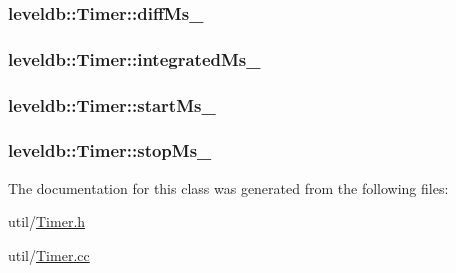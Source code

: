 \subsubsection[{diff\+Ms\+\_\+}]{ leveldb\+::\+Timer\+::diff\+Ms\+\_\+\hspace{0.3cm}{\ttfamily [private]}}\label{classleveldb_1_1_timer_a4a39508e01c4b2ac80cdd47ad0346dfb}
\hypertarget{classleveldb_1_1_timer_a5d9e98f8daf0c1868ab87a217f3c55b4}{}
\subsubsection[{integrated\+Ms\+\_\+}]{ leveldb\+::\+Timer\+::integrated\+Ms\+\_\+\hspace{0.3cm}{\ttfamily [private]}}\label{classleveldb_1_1_timer_a5d9e98f8daf0c1868ab87a217f3c55b4}
\hypertarget{classleveldb_1_1_timer_a6a1d7ee126bcfd580fc5bc6274b472b3}{}
\subsubsection[{start\+Ms\+\_\+}]{ leveldb\+::\+Timer\+::start\+Ms\+\_\+\hspace{0.3cm}{\ttfamily [private]}}\label{classleveldb_1_1_timer_a6a1d7ee126bcfd580fc5bc6274b472b3}
\hypertarget{classleveldb_1_1_timer_a2f4f49398bb7c89cec56523475ccc76a}{}
\subsubsection[{stop\+Ms\+\_\+}]{ leveldb\+::\+Timer\+::stop\+Ms\+\_\+\hspace{0.3cm}{\ttfamily [private]}}\label{classleveldb_1_1_timer_a2f4f49398bb7c89cec56523475ccc76a}


The documentation for this class was generated from the following files\+:\begin{DoxyCompactItemize}
\item 
util/\hyperlink{_timer_8h}{Timer.\+h}\item 
util/\hyperlink{_timer_8cc}{Timer.\+cc}\end{DoxyCompactItemize}
